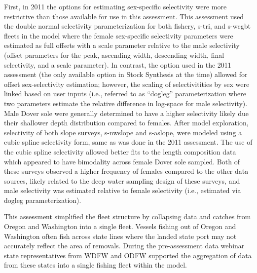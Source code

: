 \documentclass[11pt,
  english,
  a4paper,
]{article}
\begin{document}
First, in 2011 the options for estimating sex-specific selectivity were more restrictive than those available for use in this assessment. This assessment used the double normal selectivity parameterization for both fishery, \gls{s-tri}, and \gls{s-wcgbt} fleets in the model where the female sex-specific selectivity parameters were estimated as full offsets with a scale parameter relative to the male selectivity (offset parameters for the peak, ascending width, descending width, final selectivity, and a scale parameter). In contrast, the option used in the 2011 assessment (the only available option in Stock Synthesis at the time) allowed for offset sex-selectivity estimation; however, the scaling of selectivitities by sex were linked based on user inputs (i.e., referred to as ``dogleg'' parameterization where two parameters estimate the relative difference in log-space for male selectivity). Male Dover sole were generally determined to have a higher selectivity likely due their shallower depth distribution compared to females. After model exploration, selectivity of both slope surveys, \gls{s-nwslope} and \gls{s-aslope}, were modeled using a cubic spline selectivity form, same as was done in the 2011 assessment. The use of the cubic spline selectivity allowed better fits to the length composition data which appeared to have bimodality across female Dover sole sampled. Both of these surveys observed a higher frequency of females compared to the other data sources, likely related to the deep water sampling design of these surveys, and male selectivity was estimated relative to female selectivity (i.e., estimated via dogleg parameterization).

\leavevmode\tagmcend\tagstructend\par


This assessment simplified the fleet structure by collapsing data and catches from Oregon and Washington into a single fleet. Vessels fishing out of Oregon and Washington often fish across state lines where the landed state port may not accurately reflect the area of removals. During the pre-assessment data webinar state representatives from WDFW and ODFW supported the aggregation of data from these states into a single fishing fleet within the model.

\leavevmode\tagmcend\tagstructend\par

\end{document}
